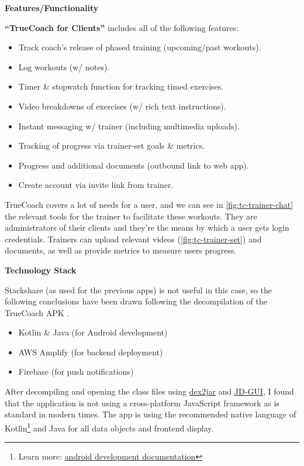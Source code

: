 \textbf{Features/Functionality}
\label{research-breakdown:tc-features}
\par
\textbf{``TrueCoach for Clients''} includes all of the following features:
\begin{multicols}{2}
	\begin{itemize}[noitemsep]
		\item Track coach's release of phased training (upcoming/past workouts).
		\item Log workouts (w/ notes).
		\item Timer \& stopwatch function for tracking timed exercises.
		\item Video breakdowns of exercises (w/ rich text instructions).
		\item Instant messaging w/ trainer (including multimedia uploads).
		\item Tracking of progress via trainer-set goals \& metrics.
		\item Progress and additional documents (outbound link to web app).
		\item Create account via invite link from trainer.
	\end{itemize}
\end{multicols}
\vspace*{-5mm}
TrueCoach covers a lot of needs for a user, and we can see in \cref{fig:tc-trainer-chat} 
the relevant tools for the trainer to facilitate these workouts. They are administrators of their
clients and they're the means by which a user gets login credentials. 
Trainers can upload relevant videos (\cref{fig:tc-trainer-set}) and documents, as well as provide metrics
to measure users progress.
\par
\textbf{Technology Stack}
\label{research-breakdown:tc-stack}
\par
Stackshare (as used for the previous apps) is not useful in this case, so the following conclusions have
been drawn following the decompilation of the TrueCoach APK \cite{apk-decompiler}.
\begin{itemize}
	\item Kotlin \& Java (for Android development)
	\item AWS Amplify (for backend deployment)
	\item Firebase (for push notifications)
\end{itemize}
After decompiling and opening the class files using \href{https://github.com/pxb1988/dex2jar}{dex2jar} and
\href{https://java-decompiler.github.io/}{JD-GUI}, I found that the application is not using a cross-platform
JavaScript framework as is standard in modern times. The app is using the recommended native language
of Kotlin\footnote{Learn more: \href{https://developer.android.com/kotlin}{android development documentation}} and Java for all data objects and frontend display. 
\pagebreak

